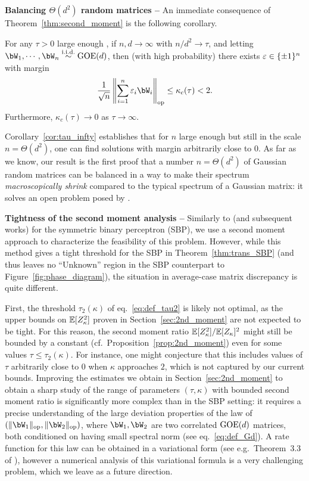 \myskip
\textbf{Balancing $\Theta(d^2)$ random matrices -- }
An immediate consequence of Theorem~\ref{thm:second_moment} is the following corollary.
\begin{corollary}\label{cor:tau_infty}
    For any $\tau > 0$ large enough\footnotemark%
    , if $n,d \to \infty$ with $n / d^2 \to \tau$, and letting $\bW_1, \cdots, \bW_n \iid \GOE(d)$,
    then (with high probability) there exists $\varepsilon \in \{\pm 1\}^n$ with margin 
    \begin{equation*}
        \frac{1}{\sqrt{n}} \left\|\sum_{i=1}^n \eps_i \bW_i\right\|_\op \leq \kappa_c(\tau) < 2.
    \end{equation*}
    Furthermore, $\kappa_c(\tau) \to 0$ as $\tau \to \infty$.
\end{corollary}
\noindent
Corollary~\ref{cor:tau_infty} establishes that for $n$ large enough but still in the scale $n = \Theta(d^2)$, one can find solutions 
with margin arbitrarily close to $0$.
As far as we know, our result is the first proof that a number $n = \Theta(d^2)$ of Gaussian random matrices can be balanced in a way to make 
their spectrum \emph{macroscopically shrink} compared to the typical spectrum of a Gaussian matrix: it solves an open problem posed by \cite{kunisky2023online}.


\myskip
\textbf{Tightness of the second moment analysis --}
Similarly to \cite{aubin2019storage} (and subsequent works) for the symmetric binary perceptron (SBP), we use a second moment approach to characterize the feasibility of this problem.  
However, while this method gives a tight threshold for the SBP in Theorem~\ref{thm:trans_SBP} (and thus leaves no ``Unknown'' region in the SBP counterpart to Figure~\ref{fig:phase_diagram}),
the situation in average-case matrix discrepancy is quite different.

\myskip
First, the threshold $\tau_2(\kappa)$ of eq.~\eqref{eq:def_tau2} is likely not optimal, 
as the upper bounds on $\mathbb{E}[Z_\kappa^2]$ proven in Section~\ref{sec:2nd_moment} are not expected to be tight.
For this reason, the second moment ratio $\mathbb{E}[Z_\kappa^2]/\mathbb{E}[Z_\kappa]^2$ might still be bounded by a constant (cf.\ Proposition~\ref{prop:2nd_moment}) even for some values $\tau \leq \tau_2(\kappa)$. 
For instance, one might conjecture that this includes values of $\tau$ arbitrarily close to $0$ when $\kappa$ approaches $2$, which is not captured by our current bounds.
Improving the estimates we obtain in Section~\ref{sec:2nd_moment} to obtain a sharp study of the range of parameters $(\tau, \kappa)$ with bounded second moment ratio is significantly more complex than in the SBP setting:
it requires a precise understanding of the large deviation properties of the law of $(\|\bW_1\|_\op, \|\bW_2\|_\op)$, where $\bW_1, \bW_2$ are two correlated $\mathrm{GOE}(d)$ matrices, both conditioned on having small spectral norm (see eq.~\eqref{eq:def_Gd}). 
A rate function for this law can be obtained in a variational form (see e.g.\ Theorem~3.3 of \cite{guionnet2004first}), however a numerical analysis of this variational formula 
is a very challenging problem, which we leave as a future direction.

